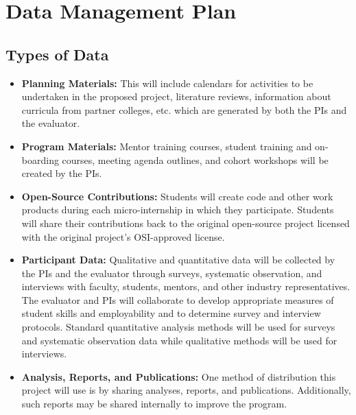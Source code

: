 %
%
\section{Data Management Plan}

\subsection{Types of Data}
\begin{itemize}
    \item \textbf{Planning Materials:} This will include calendars for activities to be undertaken in the proposed project, literature reviews, information about curricula from partner colleges, etc. which are generated by both the PIs and the evaluator.

    \item \textbf{Program Materials:} Mentor training courses, student training and on-boarding courses, meeting agenda outlines, and cohort workshops will be created by the PIs.
    
    \item \textbf{Open-Source Contributions:} Students will create code and other work products during each micro-internship in which they participate. Students will share their contributions back to the original open-source project licensed with the original project's OSI-approved license.

    \item \textbf{Participant Data:} Qualitative and quantitative data will be collected by the PIs and the evaluator through surveys, systematic observation, and interviews with faculty, students, mentors, and other industry representatives. The evaluator and PIs will collaborate to develop appropriate measures of student skills and employability and to determine survey and interview protocols. Standard quantitative analysis methods will be used for surveys and systematic observation data while qualitative methods will be used for interviews.
    
    \item \textbf{Analysis, Reports, and Publications:} One method of distribution this project will use is by sharing analyses, reports, and publications. Additionally, such reports may be shared internally to improve the program.
\end{itemize}


